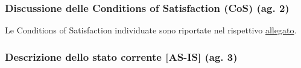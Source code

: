 \documentclass[11pt,a4paper]{article}
\begin{document}
\subsubsection{\texorpdfstring{{Discussione delle Conditions of Satisfaction (CoS) (ag. 2)}}{Discussione delle Conditions of Satisfaction (CoS) (ag. 2)}}\label{h.uicl3o5agswu}

{Le Conditions of Satisfaction individuate sono riportate nel rispettivo \hyperref[sec:cos]{allegato}.}

\subsubsection{\texorpdfstring{{Descrizione dello stato corrente {[}AS-IS{]} (ag. 3)}}{Descrizione dello stato corrente {[}AS-IS{]} (ag. 3)}}\label{h.meezg5rv8de5}
\end{document}
